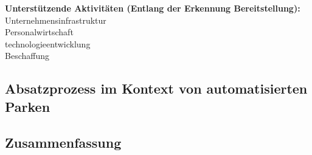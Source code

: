 \textbf{Unterstützende Aktivitäten (Entlang der Erkennung Bereitstellung):}\\
	Unternehmensinfrastruktur\\
	Personalwirtschaft\\
	technologieentwicklung\\
	Beschaffung\\

\subsection{Absatzprozess im Kontext von automatisierten Parken}\label{absatzprozess}

\subsection{Zusammenfassung}